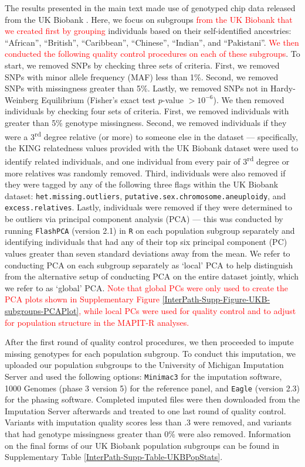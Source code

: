 \documentclass[10pt]{article}
\begin{document}
The results presented in the main text made use of genotyped chip data released from the UK Biobank \cite{Sudlow2015}. Here, we focus on subgroups \textcolor{red}{from the UK Biobank that we created first by grouping} individuals based on their self-identified ancestries: ``African'', ``British'', ``Caribbean'', ``Chinese'', ``Indian'', and ``Pakistani''. \textcolor{red}{We then conducted the following quality control procedures on each of these subgroups}. To start, we removed SNPs by checking three sets of criteria. First, we removed SNPs with minor allele frequency (MAF) less than 1\%. Second, we removed SNPs with missingness greater than 5\%. Lastly, we removed SNPs not in Hardy-Weinberg Equilibrium (Fisher's exact test $p$-value $> 10^{-6}$). We then removed individuals by checking four sets of criteria. First, we removed individuals with greater than 5\% genotype missingness. Second, we removed individuals if they were a 3\textsuperscript{rd} degree relative (or more) to someone else in the dataset --- specifically, the KING relatedness values provided with the UK Biobank dataset were used to identify related individuals, and one individual from every pair of 3\textsuperscript{rd} degree or more relatives was randomly removed. Third, individuals were also removed if they were tagged by any of the following three flags within the UK Biobank dataset: \texttt{het.missing.outliers}, \texttt{putative.sex.chromosome.aneuploidy}, and \texttt{excess.relatives}. Lastly, individuals were removed if they were determined to be outliers via principal component analysis (PCA) --- this was conducted by running \texttt{FlashPCA} (version 2.1) \cite{Abraham2017} in \texttt{R} on each population subgroup separately and identifying individuals that had any of their top six principal component (PC) values greater than seven standard deviations away from the mean. We refer to conducting PCA on each subgroup separately as `local' PCA to help distinguish from the alternative setup of conducting PCA on the entire dataset jointly, which we refer to as `global' PCA. \textcolor{red}{Note that global PCs were only used to create the PCA plots shown in Supplementary Figure \ref{InterPath-Supp-Figure-UKB-subgroups-PCAPlot}, while local PCs were used for quality control and to adjust for population structure in the MAPIT-R analyses.}  

After the first round of quality control procedures, we then proceeded to impute missing genotypes for each population subgroup. To conduct this imputation, we uploaded our population subgroups to the University of Michigan Imputation Server \cite{Das2016} and used the following options: \texttt{Minimac3} for the imputation software, 1000 Genomes (phase 3 version 5) for the reference panel, and \texttt{Eagle} (version 2.3) for the phasing software. Completed imputed files were then downloaded from the Imputation Server afterwards and treated to one last round of quality control. Variants with imputation quality scores  less than .3 were removed, and variants that had genotype missingness greater than 0\% were also removed. Information on the final forms of our UK Biobank population subgroups can be found in Supplementary Table \ref{InterPath-Supp-Table-UKBPopStats}.
\end{document}
